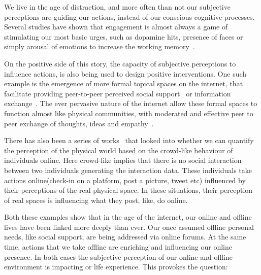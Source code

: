 We live in the age of distraction, and more often than not our subjective perceptions are guiding our actions, instead of our conscious cognitive processes. Several studies have shown that engagement is almost always a game of stimulating our most basic urges, such as dopamine hits, presence of faces or simply arousal of emotions to increase the working memory~\cite{bakhshi2014faces,joglekar2017like,schupp2006emotion,soat2015social}. 

On the positive side of this story, the capacity of subjective perceptions to influence actions, is also being used to design positive interventions. One such example is the emergence of more formal topical spaces on the internet, that facilitate providing peer-to-peer perceived social support~\cite{coulson2005receiving,balasooriya2016barriers} or information exchange~\cite{frost2008social}. The ever pervasive nature of the internet allow these formal spaces to function almost like physical communities, with moderated and effective peer to peer exchange of thoughts, ideas and empathy~\cite{kummervold2002social,squire2015should,hwang2010social}.

There has also been a series of works~\cite{jang2019crowd,quercia2014aesthetic,quercia2015smelly,quercia2015chatty,quercia2014shortest} that looked into whether we can quantify the perception of the physical world based on the crowd-like behaviour of individuals online. Here crowd-like implies that there is no social interaction between two individuals generating the interaction data. These individuals take actions online(check-in on a platform, post a picture, tweet etc) influenced by their perceptions of the real physical space. In these situations, their perception of real spaces is influencing what they post, like, do online.
 
Both these examples show that in the age of the internet, our online and offline lives have been linked more deeply than ever. Our once assumed offline personal needs, like social support,  are being addressed via online forums. At the same time, actions that we take offline are enriching and influencing our online presence. In both cases the subjective perception of our online and offline environment is impacting or life experience. This provokes the question:

\noindent{}

